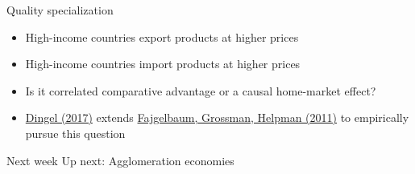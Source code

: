 \documentclass[11pt,notes=hide,aspectratio=169]{beamer}
\begin{document}
\begin{frame}{Quality specialization}
\begin{itemize}
	\item High-income countries export products at higher prices
	\item High-income countries import products at higher prices
	\item Is it correlated comparative advantage or a causal home-market effect?
	\item \href{https://academic.oup.com/restud/article/84/4/1551/2684498}{Dingel (2017)} extends \href{http://www.journals.uchicago.edu/doi/abs/10.1086/662628}{Fajgelbaum, Grossman, Helpman (2011)} to empirically pursue this question
\end{itemize}
\end{frame}
\begin{frame}{Next week}
Up next: Agglomeration economies
\end{frame}
\end{document}
